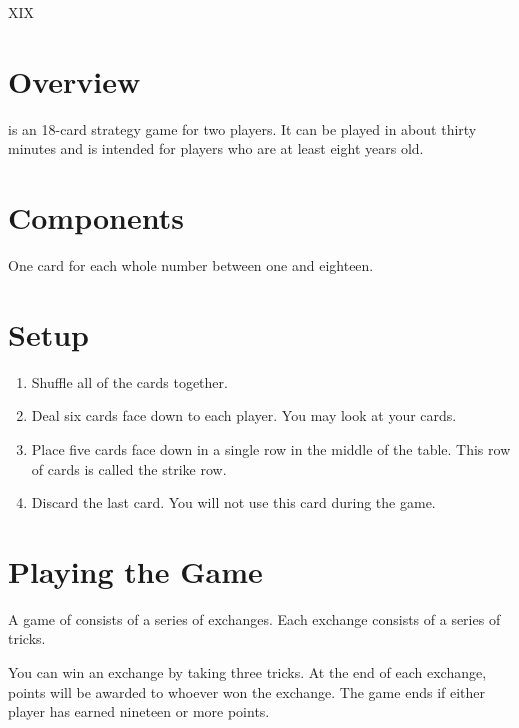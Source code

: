 \documentclass[a6paper, parskip=half, DIV=14, 10pt]{scrartcl}
\newcommand{\textRN}[1]{{\setmainfont{Roboto Slab} \RomanNumeral{#1}}}
\begin{document}
{%
\setmainfont[Scale=5.0]{Roboto Slab}
\Huge
\phantom{a}
\vfill{}
\begin{center}
XIX
\vfill
\phantom{a}
\end{center}
}%
\newpage
\setmainfont{Roboto}%
\raggedright%
\section*{Overview}
\textRN{19} is an 18-card strategy game for two players. It can be played in about thirty minutes and is intended for players who are at least eight years old.

\section*{Components}
\begin{description}[leftmargin=0pt, labelsep=\widthof{\ }]
	\item[Numbered Cards (18) \textendash] One card for each whole number between one and eighteen.
\end{description}

\section*{Setup}
\begin{enumerate}[leftmargin=*]
	\item Shuffle all of the cards together. 
	\item Deal six cards face down to each player. You may look at your cards.
	\item Place five cards face down in a single row in the middle of the table. This row of cards is called the strike row.
	\item Discard the last card. You will not use this card during the game.
\end{enumerate}

\newpage

\section*{Playing the Game}
A game of \textRN{19} consists of a series of exchanges.
Each exchange consists of a series of tricks.

You can win an exchange by taking three tricks. At the end of each exchange, points will be awarded to whoever won the exchange.
The game ends if either player has earned nineteen or more points.
\end{document}
